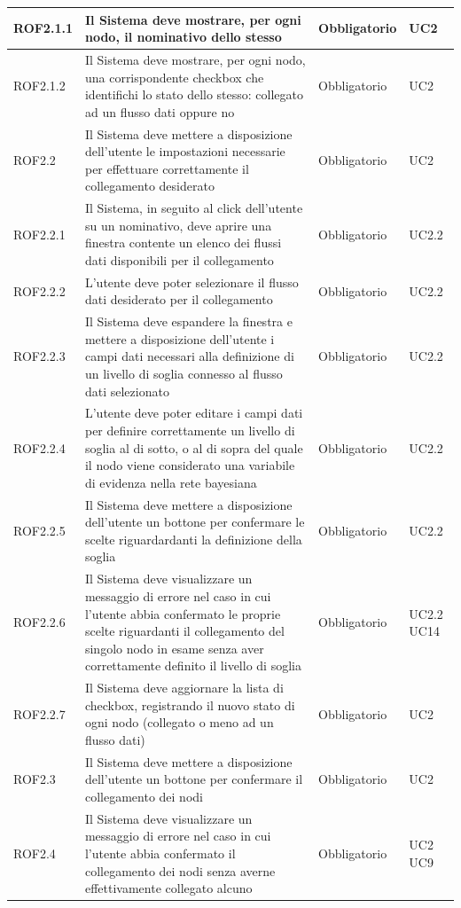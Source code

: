 \begin{center}
\begin{longtable}[c]{|m{}|m{}|m{}|m{}|}
\hline
ROF2.1.1 & Il Sistema deve mostrare, per ogni nodo, il nominativo dello stesso & Obbligatorio & UC2\\
\hline
\rowcolor{grigio}ROF2.1.2 & Il Sistema deve mostrare, per ogni nodo, una corrispondente checkbox che identifichi lo stato dello stesso: collegato ad un flusso dati oppure no & Obbligatorio & UC2\\
\hline
ROF2.2 & Il Sistema deve mettere a disposizione dell'utente le impostazioni necessarie per effettuare correttamente il collegamento desiderato & Obbligatorio & UC2\\
\hline
\rowcolor{grigio}ROF2.2.1 & Il Sistema, in seguito al click dell'utente su un nominativo, deve aprire una finestra contente un elenco dei flussi dati disponibili per il collegamento & Obbligatorio & UC2.2\\
\hline
ROF2.2.2 & L'utente deve poter selezionare il flusso dati desiderato per il collegamento & Obbligatorio & UC2.2\\
\hline
\rowcolor{grigio}ROF2.2.3 & Il Sistema deve espandere la finestra e mettere a disposizione dell'utente i campi dati necessari alla definizione di un livello di soglia connesso al flusso dati selezionato & Obbligatorio & UC2.2\\
\hline
ROF2.2.4 & L'utente deve poter editare i campi dati per definire correttamente un livello di soglia al di sotto, o al di sopra del quale il nodo viene considerato una variabile di evidenza nella rete bayesiana & Obbligatorio & UC2.2\\
\hline
\rowcolor{grigio}ROF2.2.5 & Il Sistema deve mettere a disposizione dell'utente un bottone per confermare le scelte riguardardanti la definizione della soglia & Obbligatorio & UC2.2\\
\hline
ROF2.2.6 & Il Sistema deve visualizzare un messaggio di errore nel caso in cui l'utente abbia confermato le proprie scelte riguardanti il collegamento del singolo nodo in esame senza aver correttamente definito il livello di soglia & Obbligatorio & UC2.2 UC14\\
\hline
\rowcolor{grigio}ROF2.2.7 & Il Sistema deve aggiornare la lista di checkbox, registrando il nuovo stato di ogni nodo (collegato o meno ad un flusso dati) & Obbligatorio & UC2\\
\hline
ROF2.3 & Il Sistema deve mettere a disposizione dell'utente un bottone per confermare il collegamento dei nodi & Obbligatorio & UC2\\
\hline
\rowcolor{grigio}ROF2.4 & Il Sistema deve visualizzare un messaggio di errore nel caso in cui l'utente abbia confermato il collegamento dei nodi senza averne effettivamente collegato alcuno & Obbligatorio & UC2 UC9\\

\end{longtable}
\end{center}
